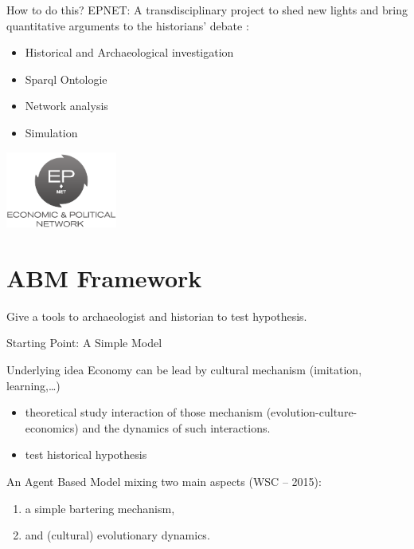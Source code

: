 \documentclass[12pt, handout=show,notes=show]{beamer}
\begin{document}
\begin{frame}{How to do this?}
	EPNET:	A transdisciplinary project to shed new lights and bring quantitative arguments to the historians' debate :
	\begin{itemize}
		\item Historical and Archaeological investigation
		\item Sparql Ontologie
		\item Network analysis
		\item Simulation
	\end{itemize}
	\begin{center}
		\includegraphics[height=2.5cm]{images/epnetLogo.png}
	\end{center}
	
\end{frame}
\section{ABM Framework}

\begin{frame}
    Give a tools to archaeologist and historian to test hypothesis.
\end{frame}


\begin{frame}{Starting Point: A Simple Model}

	\begin{alertblock}{Underlying idea}
	    Economy can be lead by cultural mechanism (imitation, learning,\dots)
	    \begin{itemize}
		\item theoretical study interaction of those mechanism (evolution-culture-economics) and the dynamics of such interactions.
		\item test historical hypothesis
	    \end{itemize}
	\end{alertblock}

	An Agent Based Model mixing two main aspects (WSC -- 2015):

	\vfil
	\begin{enumerate}
		\item a	simple bartering mechanism,
		\item and (cultural) evolutionary dynamics.
	\end{enumerate}

\end{frame}
\end{document}
